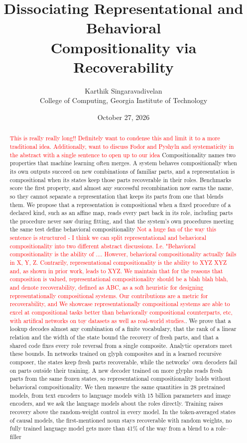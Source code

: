 \documentclass[10pt]{article}
\title{Dissociating Representational and Behavioral\\ Compositionality via Recoverability}
\author{Karthik Singaravadivelan\\ College of Computing, Georgia Institute of Technology}
\date{October 27, 2026}
\newcommand{\note}[1]{\textcolor{red}{#1}}
\theoremstyle{plain}
\theoremstyle{remark}
\begin{document}
\maketitle

\begin{abstract}
\note{This is really really long!! Definitely want to condense this and limit it to a more traditional idea. Additionally, want to discuss Fodor and Pyshyln and systematicity in the abstract with a single sentence to open up to our idea} Compositionality names two properties that machine learning often merges. A system behaves compositionally when its own outputs succeed on new combinations of familiar parts, and a representation is compositional when its states keep those parts recoverable in their roles. Benchmarks score the first property, and almost any successful recombination now earns the name, so they cannot separate a representation that keeps its parts from one that blends them. We propose that a representation is compositional when a fixed procedure of a declared kind, such as an affine map, reads every part back in its role, including parts the procedure never saw during fitting, and that the system's own procedures meeting the same test define behavioral compositionality \note{Not a huge fan of the way this sentence is structured - I think we can split representational and behavioral compositionality into two different abstract discussions. I.e. "Behavioral compositionality is the ability of .... However, behavioral compositionality actually fails in X, Y, Z.  Contrarily, representational compositionality is the ability to XYZ XYZ and, as shown in prior work, leads to XYZ. We maintain that for the reasons that composition is valued, representational compositionality should be a blah blah blah, and denote recoverability, defined as ABC, as a soft heuristic for designing representationally compositional systems. Our contributions are a metric for recoverability, and We showcase representationally compositional systems are able to excel at compositional tasks better than behaviorally compositional counterparts, etc, with artifical networks on toy datasets as well as real-world studies.}. We prove that a lookup decodes almost any combination of a finite vocabulary, that the rank of a linear relation and the width of the state bound the recovery of fresh parts, and that a shared code fixes every role reversal from a single composite. Analytic operators meet these bounds. In networks trained on glyph composites and in a learned recursive composer, the states keep fresh parts recoverable, while the networks' own decoders fail on parts outside their training. A new decoder trained on more glyphs reads fresh parts from the same frozen states, so representational compositionality holds without behavioral compositionality. We then measure the same quantities in 28 pretrained models, from text encoders to language models with 15 billion parameters and image encoders, and we ask the language models about the roles directly. Training raises recovery above the random-weight control in every model. In the token-averaged states of causal models, the first-mentioned noun stays recoverable with random weights, no fully trained language model gets more than 41\% of the way from a blend to a role--filler 
\end{abstract}
\end{document}
